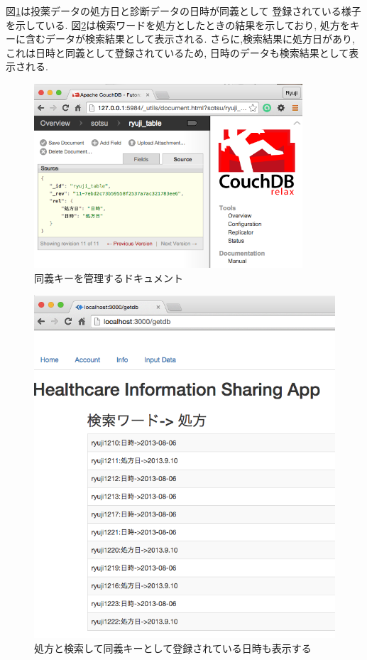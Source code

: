 		図\ref{relation}は投薬データの処方日と診断データの日時が同義として
		登録されている様子を示している.
		図\ref{relationApp}は検索ワードを処方としたときの結果を示しており,
		処方をキーに含むデータが検索結果として表示される.
		さらに,検索結果に処方日があり,これは日時と同義として登録されているため,
		日時のデータも検索結果として表示される.


		\begin{figure}[htbp]
			\begin{center}
				\includegraphics[width=10cm, bb=0 0 609 478, clip]{./gazou/relation2.png}
			\end{center}
			\caption{同義キーを管理するドキュメント}
			\label{relation}
		\end{figure}

		\begin{figure}[htbp]
			\begin{center}
				\includegraphics[width=15cm, bb=0 0 609 528, clip]{./gazou/relationApp4.png}
			\end{center}
			\caption{処方と検索して同義キーとして登録されている日時も表示する}
			\label{relationApp}
		\end{figure}




